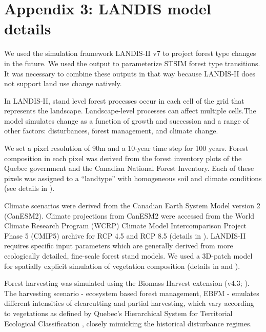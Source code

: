 
\chapter*{\textbf{Appendix 3: LANDIS model details \\ \hspace{1em}}}

\setcounter{chapter}{5}
\setcounter{table}{0}
\setcounter{figure}{0}

We used the simulation framework LANDIS-II v7 \citep{scheller_forest_2004} to project forest type changes in the future. We used the output to parameterize STSIM forest type transitions. It was necessary to combine these outputs in that way because LANDIS-II does not support land use change natively.

In LANDIS-II, stand level forest processes occur in each cell of the grid that represents the landscape. Landscape-level processes can affect multiple cells.The model simulates change as a function of growth and succession and a range of other factors: disturbances, forest management, and climate change. 

We set a pixel resolution of 90m and a 10-year time step for 100 years. Forest composition in each pixel was derived from the forest inventory plots of the Quebec government and the Canadian National Forest Inventory. Each of these pixels was assigned to a “landtype” with homogeneous soil and climate conditions (see details in \cite{boulanger_climate_2019}).

Climate scenarios were derived from the Canadian Earth System Model version 2 (CanESM2). Climate projections from CanESM2 were accessed from the World Climate Research Program (WCRP) Climate Model Intercomparison Project Phase 5 (CMIP5) archive for RCP 4.5 and RCP 8.5 (details in \cite{boulanger_climate_2019}).
LANDIS-II requires specific input parameters which are generally derived from more ecologically detailed, fine-scale forest stand models. We used a 3D-patch model for spatially explicit simulation of vegetation composition (details in \cite{lexer_modified_2001} and \cite{tremblay_harvesting_2018}).

Forest harvesting was simulated using the Biomass Harvest extension (v4.3; \cite{gustafson_spatial_2000}). The harvesting scenario - ecosystem based forest management, EBFM - emulates different intensities of clearcutting and partial harvesting, which vary according to vegetations as defined by Quebec’s Hierarchical System for Territorial Ecological Classification \citep{bergeron_quebec_1992}, closely mimicking the historical disturbance regimes.